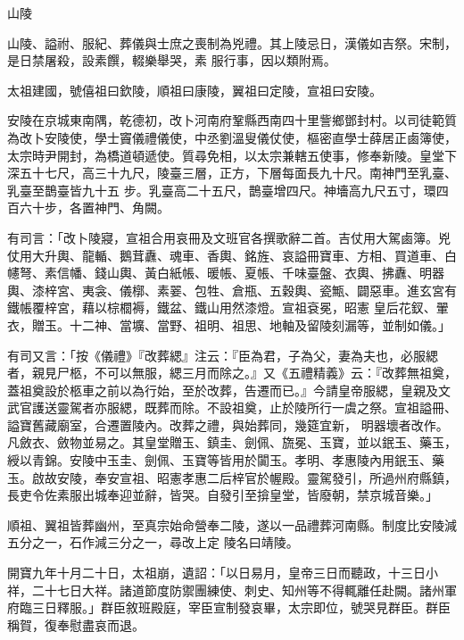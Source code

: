 
\begin{pinyinscope}

 山陵



 山陵、謚祔、服紀、葬儀與士庶之喪制為兇禮。其上陵忌日，漢儀如吉祭。宋制，是日禁屠殺，設素饌，輟樂舉哭，素
 服行事，因以類附焉。



 太祖建國，號僖祖曰欽陵，順祖曰康陵，翼祖曰定陵，宣祖曰安陵。



 安陵在京城東南隅，乾德初，改卜河南府鞏縣西南四十里訾鄉鄧封村。以司徒範質為改卜安陵使，學士竇儀禮儀使，中丞劉溫叟儀仗使，樞密直學士薛居正鹵簿使，太宗時尹開封，為橋道頓遞使。質尋免相，以太宗兼轄五使事，修奉新陵。皇堂下深五十七尺，高三十九尺，陵臺三層，正方，下層每面長九十尺。南神門至乳臺、乳臺至鵲臺皆九十五
 步。乳臺高二十五尺，鵲臺增四尺。神墻高九尺五寸，環四百六十步，各置神門、角闕。



 有司言：「改卜陵寢，宣祖合用哀冊及文班官各撰歌辭二首。吉仗用大駕鹵簿。兇仗用大升輿、龍輴、鵝茸纛、魂車、香輿、銘旌、哀謚冊寶車、方相、買道車、白幰弩、素信幡、錢山輿、黃白紙帳、暖帳、夏帳、千味臺盤、衣輿、拂纛、明器輿、漆梓宮、夷衾、儀槨、素翣、包牲、倉瓶、五穀輿、瓷甒、闢惡車。進玄宮有鐵帳覆梓宮，藉以棕櫚褥，鐵盆、鐵山用然漆燈。宣祖袞冕，昭憲
 皇后花釵、翬衣，贈玉。十二神、當壙、當野、祖明、祖思、地軸及留陵刻漏等，並制如儀。」



 有司又言：「按《儀禮》『改葬緦』注云：『臣為君，子為父，妻為夫也，必服緦者，親見尸柩，不可以無服，緦三月而除之。』又《五禮精義》云：『改葬無祖奠，蓋祖奠設於柩車之前以為行始，至於改葬，告遷而已。』今請皇帝服緦，皇親及文武官護送靈駕者亦服緦，既葬而除。不設祖奠，止於陵所行一虞之祭。宣祖謚冊、謚寶舊藏廟室，合遷置陵內。改葬之禮，與始葬同，幾筵宜新，
 明器壞者改作。凡斂衣、斂物並易之。其皇堂贈玉、鎮圭、劍佩、旒冕、玉寶，並以鈱玉、藥玉，綬以青錦。安陵中玉圭、劍佩、玉寶等皆用於闐玉。孝明、孝惠陵內用鈱玉、藥玉。啟故安陵，奉安宣祖、昭憲孝惠二后梓官於幄殿。靈駕發引，所過州府縣鎮，長吏令佐素服出城奉迎並辭，皆哭。自發引至揜皇堂，皆廢朝，禁京城音樂。」



 順祖、翼祖皆葬幽州，至真宗始命營奉二陵，遂以一品禮葬河南縣。制度比安陵減五分之一，石作減三分之一，尋改上定
 陵名曰靖陵。



 開寶九年十月二十日，太祖崩，遺詔：「以日易月，皇帝三日而聽政，十三日小祥，二十七日大祥。諸道節度防禦團練使、刺史、知州等不得輒離任赴闕。諸州軍府臨三日釋服。」群臣敘班殿庭，宰臣宣制發哀畢，太宗即位，號哭見群臣。群臣稱賀，復奉慰盡哀而退。




\end{pinyinscope}
